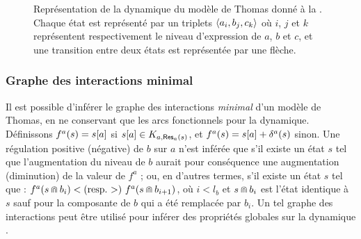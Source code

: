 \begin{example}
  \begin{figure}[ht]
    \begin{center}
    \end{center}
    \caption{%
      Représentation de la dynamique du modèle de Thomas donné à la .
      Chaque état est représenté par un triplets $\mbox{$\langle a_i, b_j, c_k \rangle$}$
      où $i$, $j$ et $k$ représentent respectivement le niveau d'expression de $a$, $b$ et $c$,
      et une transition entre deux états est représentée par une flèche.
    }
  \end{figure}
\end{example}



\subsubsection*{Graphe des interactions minimal}
Il est possible d'inférer le graphe des interactions \emph{minimal} d'un modèle de Thomas,
en ne conservant que les arcs fonctionnels pour la dynamique.
Définissons $f^a(s) = {s[a]}$ si $s[a]\in K_{a, \mathsf{Res}_{a}(s)}$,
et $f^a(s) = {s[a]} + \delta^a(s)$ sinon.
Une régulation positive (\resp négative) de $b$ sur $a$ n'est inférée que s'il existe
un état $s$ tel que l'augmentation du niveau de $b$ aurait pour conséquence
une augmentation (\resp diminution) de la valeur de $f^a$ ;
ou, en d'autres termes, s'il existe un état $s$ tel que :
$f^a(s \Cap b_i) < \text{(resp.\ $>$) } f^a(s \Cap b_{i+1})$, 
où $i < l_b$ et $s \Cap b_i$ est l'état identique à $s$
sauf pour la composante de $b$ qui a été remplacée par $b_i$.
Un tel graphe des interactions peut être utilisé pour inférer des propriétés globales sur
la dynamique .

